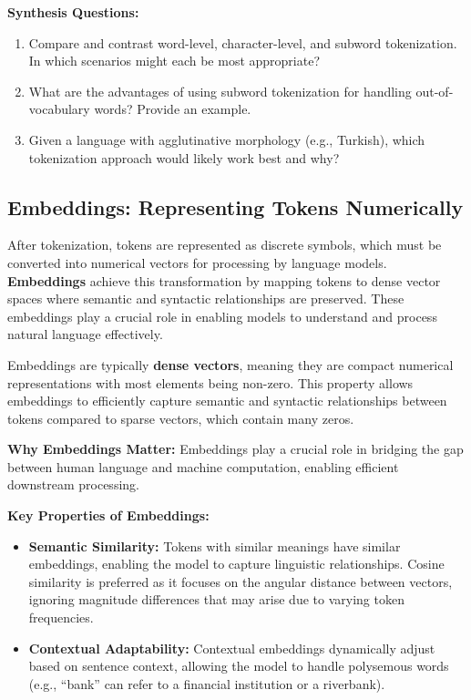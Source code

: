 \begin{questionbox}
\textbf{Synthesis Questions:}
\begin{enumerate}
    \item Compare and contrast word-level, character-level, and subword tokenization. In which scenarios might each be most appropriate?
    \item What are the advantages of using subword tokenization for handling out-of-vocabulary words? Provide an example.
    \item Given a language with agglutinative morphology (e.g., Turkish), which tokenization approach would likely work best and why?
\end{enumerate}
\end{questionbox}


\subsection{Embeddings: Representing Tokens Numerically}

    \large After tokenization, tokens are represented as discrete symbols, which must be converted into numerical vectors for processing by language models. \textbf{Embeddings} achieve this transformation by mapping tokens to dense vector spaces where semantic and syntactic relationships are preserved. These embeddings play a crucial role in enabling models to understand and process natural language effectively. 

    Embeddings are typically \textbf{dense vectors}, meaning they are compact numerical representations with most elements being non-zero. This property allows embeddings to efficiently capture semantic and syntactic relationships between tokens compared to sparse vectors, which contain many zeros. 

    \textbf{Why Embeddings Matter:}
    Embeddings play a crucial role in bridging the gap between human language and machine computation, enabling efficient downstream processing. 

    \textbf{Key Properties of Embeddings:}
    \begin{itemize}
        \item \textbf{Semantic Similarity:} Tokens with similar meanings have similar embeddings, enabling the model to capture linguistic relationships. Cosine similarity is preferred as it focuses on the angular distance between vectors, ignoring magnitude differences that may arise due to varying token frequencies.
        \item \textbf{Contextual Adaptability:} Contextual embeddings dynamically adjust based on sentence context, allowing the model to handle polysemous words (e.g., ``bank'' can refer to a financial institution or a riverbank).
    \end{itemize} 


